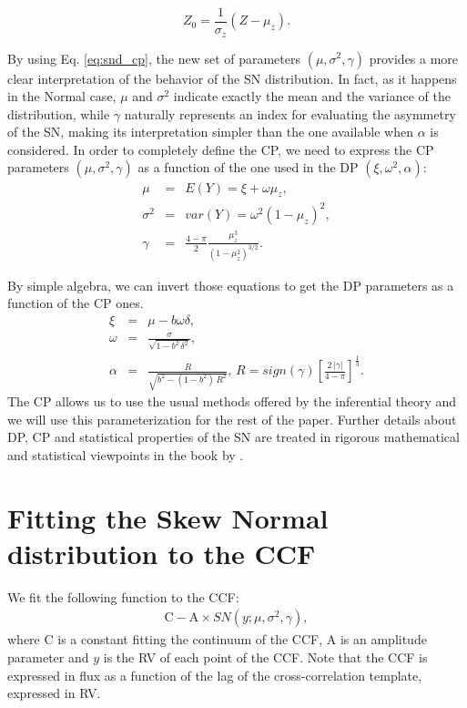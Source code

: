 \documentclass[11pt, oneside]{article}
\begin{document}
\begin{equation} \label{eq:snd_cp}
Z_{0}=\frac{1}{\sigma_{z}}\left(Z-\mu_{z}\right).
\end{equation}

By using Eq. \ref{eq:snd_cp}, the new set of parameters $(\mu, \sigma^2, \gamma)$ provides a more clear interpretation of the behavior of the SN distribution. In fact, as it happens in the Normal case, $\mu$ and $\sigma^2$ indicate exactly the mean and the variance of the distribution, while $\gamma$ naturally represents an index for evaluating the asymmetry of the SN, making its interpretation simpler than the one available when $\alpha$ is considered. In order to completely define the CP, we need to express the CP parameters $(\mu, \sigma^2, \gamma)$ as a function of the one used in the DP $(\xi, \omega^2, \alpha)$:
%
\begin{eqnarray} \label{eq:1}
\mu &=& E(Y) = \xi + \omega \mu_{z}, \\
\sigma^{2} &=& var(Y) = \omega^{2} (1-\mu_{z})^2, \nonumber\\
\gamma &=& \frac{4-\pi}{2} \frac{\mu_{z}^{3}}{\left(1-\mu_{z}^2\right)^{3/2}}. \nonumber
\end{eqnarray}

By simple algebra, we can invert those equations to get the DP parameters as a function of the CP ones.
%
\begin{eqnarray} \label{eq:2}
\xi &=& \mu - b\omega\delta, \\
\omega &=& \frac{\sigma}{\sqrt{1 - b^2\,\delta^2}}, \nonumber\\
\alpha &=& \frac{R}{\sqrt{b^2 - (1-b^2)\,R^2}},\,R = sign(\gamma) \left[\frac{2\,|\gamma|}{4-\pi}\right]^{\frac{1}{3}}. \nonumber
\end{eqnarray}
%
The CP allows us to use the usual methods offered by the inferential theory and we will use this parameterization for the rest of the paper. Further details about DP, CP and statistical properties of the SN are treated in rigorous mathematical and statistical viewpoints in the book by \cite{Azzalini2014}.

\section{Fitting the Skew Normal distribution to the CCF} \label{sec:3}

We fit the following function to the CCF:
%
\begin{eqnarray} \label{eq:3}
\mathrm{C} - \mathrm{A} \times SN(y;\mu, \sigma^2, \gamma),
\end{eqnarray}
%
where C is a constant fitting the continuum of the CCF, A is an amplitude parameter and $y$ is the RV of each point of the CCF. Note that the CCF is expressed in flux as a function of the lag of the cross-correlation template, expressed in RV.
\end{document}
